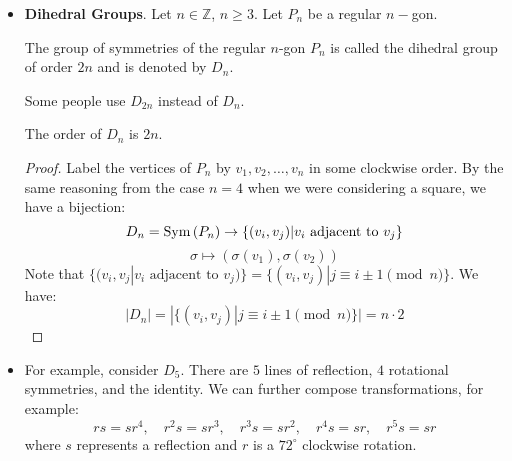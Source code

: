 \begin{itemize}
\begin{lemma}
    \end{lemma}
    \item \textbf{Dihedral Groups}. Let $n\in \mathbb{Z}$, $n\ge 3$. Let $P_n$ be a regular $n-$gon.
    \begin{definition}
        The group of symmetries of the regular $n$-gon $P_n$ is called the dihedral group of order $2n$ and is denoted by $D_n$.
    \end{definition}
    \begin{warning}
        Some people use $D_{2n}$ instead of $D_{n}$.
    \end{warning}
    \begin{lemma}
        The order of $D_n$ is $2n$.
        \begin{proof}
            Label the vertices of $P_n$ by $v_1,v_2,\dots,v_n$ in some clockwise order. By the same reasoning from the case $n=4$ when we were considering a square, we have a bijection:
            \begin{equation}
                D_n = \mathrm{Sym}\,(P_n) \rightarrow \{(v_i,v_j)|v_i\text{ adjacent to } v_j\}
            \end{equation}
            \begin{equation}
                \sigma \mapsto (\sigma(v_1), \sigma(v_2))
            \end{equation}
            Note that $\{(v_i,v_j | v_i \text{ adjacent to } v_j)\} = \{(v_i,v_j)| j \equiv i \pm 1 \pmod{n}\}$. We have:
            \begin{equation}
                |D_n| = |\{(v_i,v_j)| j \equiv i \pm 1 \pmod{n}\}| = n\cdot 2
            \end{equation}
        \end{proof}
    \end{lemma}
    \item For example, consider $D_5$. There are $5$ lines of reflection, $4$ rotational symmetries, and the identity. We can further compose transformations, for example:
    \begin{equation}
        rs=sr^4,\quad r^2s=sr^3,\quad r^3s=sr^2,\quad r^4s=sr,\quad r^5s = sr
    \end{equation}
    where $s$ represents a reflection and $r$ is a $72^\circ$ clockwise rotation.
    \begin{center}
        \newdimen\R
        \R=1.5cm
\end{center}
\end{itemize}
